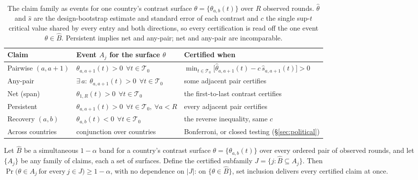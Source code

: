\begin{table}[t]
\centering\small
\begin{tabular}{@{}lll@{}}
\toprule
Claim & Event $A_j$ for the surface $\theta$ & Certified when \\
\midrule
Pairwise $(a,a{+}1)$ & $\theta_{a,a+1}(t)>0\ \ \forall t\in\mathcal T_0$ &
  $\min_{t\in\mathcal T_0}\big[\widehat\theta_{a,a+1}(t)-c\,\widehat s_{a,a+1}(t)\big]>0$ \\
Any-pair & $\exists\,a:\ \theta_{a,a+1}(t)>0\ \ \forall t\in\mathcal T_0$ &
  some adjacent pair certifies \\
Net (span) & $\theta_{1,R}(t)>0\ \ \forall t\in\mathcal T_0$ &
  the first-to-last contrast certifies \\
Persistent & $\theta_{a,a+1}(t)>0\ \ \forall t\in\mathcal T_0,\ \forall a<R$ &
  every adjacent pair certifies \\
Recovery $(a,b)$ & $\theta_{a,b}(t)<0\ \ \forall t\in\mathcal T_0$ &
  the reverse inequality, same $c$ \\
Across countries & conjunction over countries &
  Bonferroni, or closed testing (\S\ref{sec:political}) \\
\bottomrule
\end{tabular}
\caption{The claim family as events for one country's contrast surface
$\theta=\{\theta_{a,b}(t)\}$ over $R$ observed rounds. $\widehat\theta$ and
$\widehat s$ are the design-bootstrap estimate and standard error of each
contrast and $c$ the single sup-$t$ critical value shared by every entry and
both directions, so every certification is read off the one event
$\theta\in\widehat B$. Persistent implies net and any-pair; net and any-pair
are incomparable.}\label{tab:claims}
\end{table}

\begin{proposition}\label{prop:transfer}
Let $\widehat B$ be a simultaneous $1-\alpha$ band for a country's contrast
surface $\theta=\{\theta_{a, b}(t)\}$ over every ordered pair of observed rounds,
and let $\{A_j\}$ be any family of claims, each a set of surfaces. Define
the certified subfamily $J=\{j: \widehat B\subseteq A_j\}$. Then
$\Pr\big(\theta\in A_j\ \text{for every}\ j\in J\big)\ge1-\alpha$, with no
dependence on $|J|$: on $\{\theta\in\widehat B\}$, set inclusion delivers every
certified claim at once.
\end{proposition}


